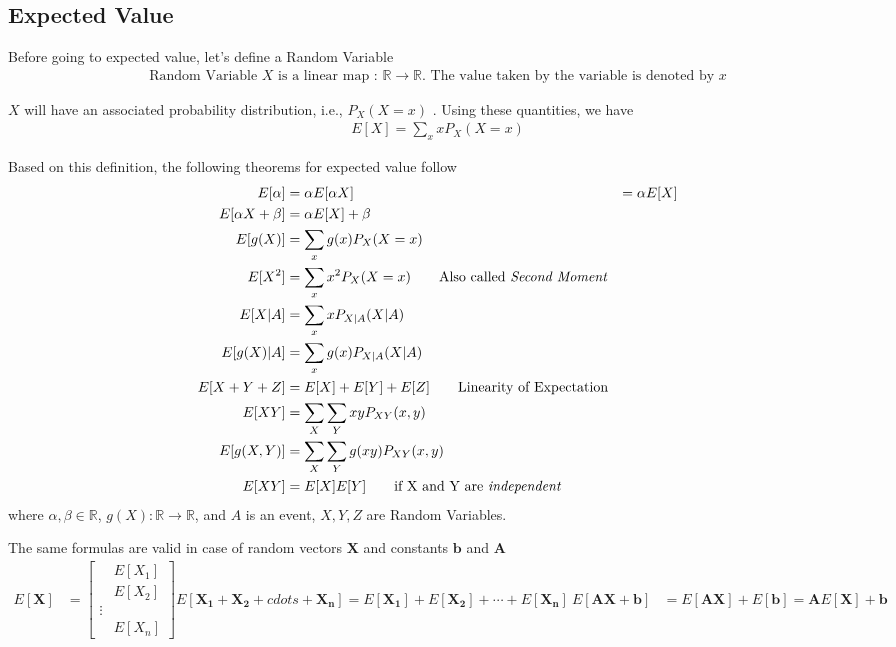 \documentclass[../probability-notes.tex]{subfiles}
\begin{document}
    \subsection{Expected Value}
    Before going to expected value, let's define a Random Variable
    \begin{align*}
        \text{Random Variable } X \text{ is a linear map : } \mathbb{R} \to \mathbb{R} \text{. The value taken by the variable is denoted by } x
    \end{align*}
    
    $X$ will have an associated probability distribution, i.e., $P_{X}(X = x)$ . Using these quantities, we have
    \begin{align*}
        E[X] = \sum_x xP_{X}(X = x) \tag*{Expected Value}
    \end{align*}

    Based on this definition, the following theorems for expected value follow
    \begin{align*}
        E[\alpha] &= \alpha
        E[\alpha X] &= \alpha E[X] \\
        E[\alpha X + \beta] &= \alpha E[X] + \beta \\
        E[g(X)] &= \sum_x g(x)P_{X}(X = x) \\
        E[X^{2}] &= \sum_x x^{2} P_{X}(X = x) \tag*{Also called \emph{Second Moment}}\\
        E[X|A] &= \sum_{x} x P_{X|A}(X|A) \\
        E[g(X)|A] &= \sum_{x} g(x) P_{X|A}(X|A) \\
        E[X + Y + Z] &= E[X] + E[Y] + E[Z] \tag*{Linearity of Expectation}\\
        E[XY] &= \sum_{X} \sum_{Y} xy P_{XY}(x,y) \\
        E[g(X,Y)] &= \sum_{X} \sum_{Y} g(xy) P_{XY}(x,y) \\
        E[XY] &= E[X]E[Y] \tag*{if X and Y are \emph{independent}}
    \end{align*}
    where $\alpha, \beta \in \mathbb{R}$, $g(X) : \mathbb{R} \rightarrow \mathbb{R}$, and $A$ is an event, $X, Y, Z$ are Random Variables.\newline

    The same formulas are valid in case of random vectors $\mathbf{X}$ and constants $\mathbf{b}$ and $\mathbf{A}$
    \begin{align*}
        E[\mathbf{X}] &= \begin{bmatrix}
        &E[X_{1}]\\
        &E[X_{2}]\\
        \vdots\\
        &E[X_{n}]
        \end{bmatrix}
        E[\mathbf{X_{1}} + \mathbf{X_{2}} + cdots + \mathbf{X_{n}}] = E[\mathbf{X_{1}}] + E[\mathbf{X_{2}}] + \cdots + E[\mathbf{X_{n}}]\
        E[\mathbf{A}\mathbf{X}+\mathbf{b}] &= E[\mathbf{A}\mathbf{X}] + E[\mathbf{b}] = \mathbf{A}E[\mathbf{X}] + \mathbf{b}\\
    \end{align*}
\end{document}
